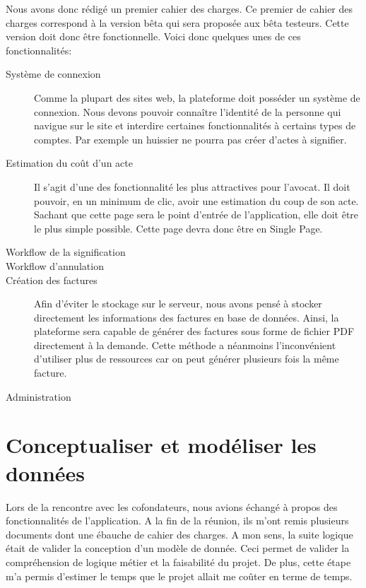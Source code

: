 \documentclass[]{report}
\begin{document}
    Nous avons donc rédigé un premier cahier des charges. Ce premier de cahier des charges correspond à la version bêta qui sera proposée aux bêta testeurs. Cette version doit donc être fonctionnelle. Voici donc quelques unes de ces fonctionnalités:

    \begin{description}
      \item[Système de connexion] Comme la plupart des sites web, la plateforme doit posséder un système de connexion. Nous devons pouvoir connaître l’identité de la personne qui navigue sur le site et interdire certaines fonctionnalités à certains types de comptes. Par exemple un huissier ne pourra pas créer d'actes à signifier.
      \item[Estimation du coût d'un acte] Il s'agit d'une des fonctionnalité les plus attractives pour l'avocat. Il doit pouvoir, en un minimum de clic, avoir une estimation du coup de son acte. Sachant que cette page sera le point d'entrée de l'application, elle doit être le plus simple possible. Cette page devra donc être en Single Page.
      \item[Workflow de la signification] %
      \item[Workflow d'annulation] %
      \item[Création des factures] Afin d'éviter le stockage sur le serveur, nous avons pensé à stocker directement les informations des factures en base de données. Ainsi, la plateforme sera capable de générer des factures sous forme de fichier PDF directement à la demande. Cette méthode a néanmoins l'inconvénient d'utiliser plus de ressources car on peut générer plusieurs fois la même facture.
      \item[Administration] %
    \end{description}


  \section{Conceptualiser et modéliser les données}

    Lors de la rencontre avec les cofondateurs, nous avions échangé à propos des fonctionnalités de l'application. A la fin de la réunion, ils m'ont remis plusieurs documents dont une ébauche de cahier des charges. A mon sens, la suite logique était de valider la conception d'un modèle de donnée. Ceci permet de valider la compréhension de logique métier et la faisabilité du projet. De plus, cette étape m'a permis d'estimer le temps que le projet allait me coûter en terme de temps.
\end{document}
